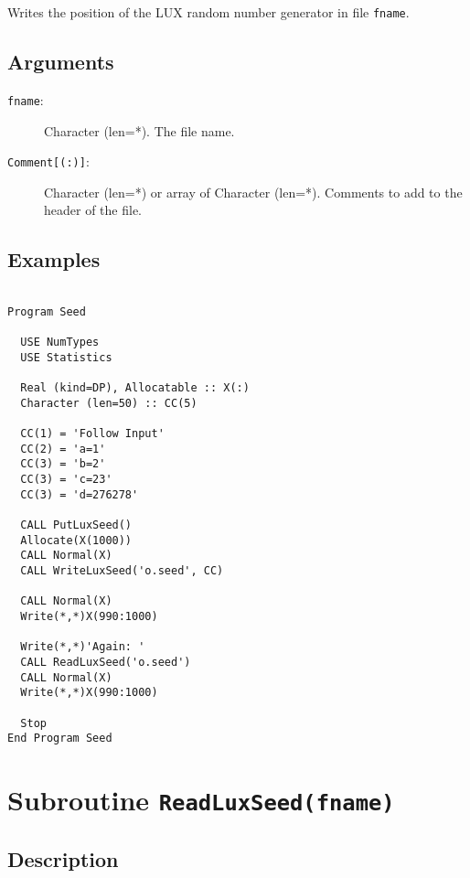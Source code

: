 Writes the position of the LUX random number generator in file
\texttt{fname}. 

\subsection{Arguments}

\begin{description}
\item[\texttt{fname}:] Character (len=*). The file name.
\item[\texttt{Comment[(:)]}:] Character (len=*) or array of Character
  (len=*). Comments to add to the header of the file. 
\end{description}

\subsection{Examples}

\begin{lstlisting}[emph=WriteLuxSeed,
                   emphstyle=\color{blue},
                   frame=trBL,
                   caption=Using a previously saved point in the generating process.,
                   label=writeluxseed]

Program Seed

  USE NumTypes
  USE Statistics

  Real (kind=DP), Allocatable :: X(:)
  Character (len=50) :: CC(5)

  CC(1) = 'Follow Input'
  CC(2) = 'a=1'
  CC(3) = 'b=2'
  CC(3) = 'c=23'
  CC(3) = 'd=276278'

  CALL PutLuxSeed()
  Allocate(X(1000))
  CALL Normal(X)
  CALL WriteLuxSeed('o.seed', CC)

  CALL Normal(X)
  Write(*,*)X(990:1000)

  Write(*,*)'Again: '
  CALL ReadLuxSeed('o.seed')
  CALL Normal(X)
  Write(*,*)X(990:1000)

  Stop
End Program Seed
\end{lstlisting}


\section{Subroutine \texttt{ReadLuxSeed(fname)}}

\subsection{Description}

